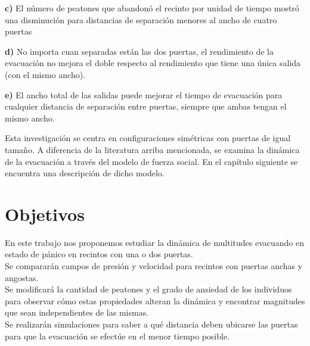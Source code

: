 \forceindent \textbf{c)} El número de peatones que abandonó el recinto por unidad de tiempo mostró una disminución para distancias de separación menores al ancho de cuatro puertas

\forceindent \textbf{d)} No importa cuan separadas están las dos puertas, el rendimiento de la evacuación no mejora el doble respecto al rendimiento que tiene una única salida (con el mismo ancho).

\forceindent \textbf{e)} El ancho total de las salidas puede mejorar el tiempo de evacuación para cualquier distancia de separación entre puertas, siempre que ambas tengan el mismo ancho.

\noindent Esta investigación se centra en configuraciones simétricas con puertas de igual tamaño. A diferencia de la literatura arriba mencionada, se examina la dinámica de la evacuación a través del modelo de fuerza social. En el capítulo siguiente se encuentra una descripción de dicho modelo. \\

\newpage

\section{Objetivos}

En este trabajo nos proponemos estudiar la dinámica de multitudes evacuando en estado de  pánico en recintos con una o dos puertas.\\ 

Se compararán campos de presión y velocidad para recintos con puertas anchas y angostas.\\

Se modificará la cantidad de peatones y el grado de ansiedad de los individuos para observar cómo estas propiedades alteran la dinámica y encontrar magnitudes que sean independientes de las mismas.\\

Se realizarán simulaciones para saber a qué distancia deben ubicarse las puertas para que la evacuación se efectúe en el menor tiempo posible.



